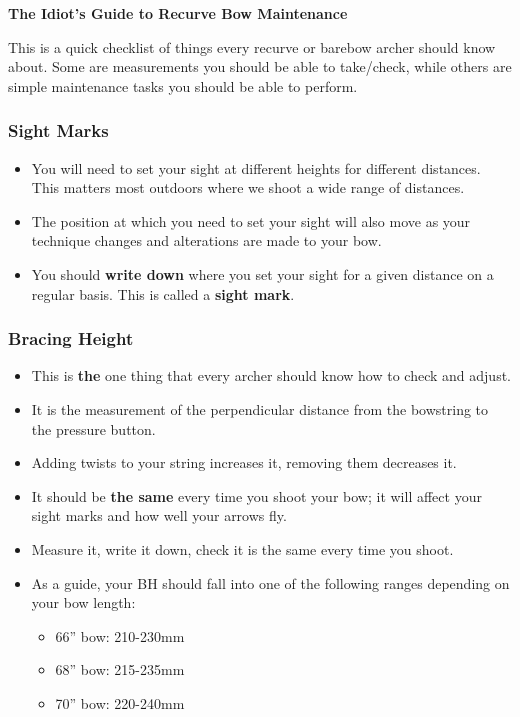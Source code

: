\documentclass[12pt]{article}
\begin{document}
\begin{center}
	\large{\textbf{The Idiot's Guide to Recurve Bow Maintenance}}
\end{center}

This is a quick checklist of things every recurve or barebow archer should know
about. Some are measurements you should be able to take/check, while others are
simple maintenance tasks you should be able to perform.

\subsubsection*{Sight Marks}

\begin{itemize}
	\item You will need to set your sight at different heights for different
		distances. This matters most outdoors where we shoot a wide range of
		distances.
	\item The position at which you need to set your sight will also move as
		your technique changes and alterations are made to your bow.
	\item You should {\bf write down} where you set your sight for a given
		distance on a regular basis. This is called a {\bf sight mark}.
\end{itemize}

\subsubsection*{Bracing Height}

\begin{itemize}
	\item This is {\bf the} one thing that every archer should know how to
		check and adjust.
	\item It is the measurement of the perpendicular distance from the bowstring
		to the pressure button.
	\item Adding twists to your string increases it, removing them decreases it.
	\item It should be {\bf the same} every time you shoot your bow; it will
		affect your sight marks and how well your arrows fly.
	\item Measure it, write it down, check it is the same every time you shoot.
	\item As a guide, your BH should fall into one of the following ranges
		depending on your bow length:
		\begin{itemize}
			\item 66'' bow: 210-230mm
			\item 68'' bow: 215-235mm
			\item 70'' bow: 220-240mm
		\end{itemize}
\end{itemize}
\end{document}
